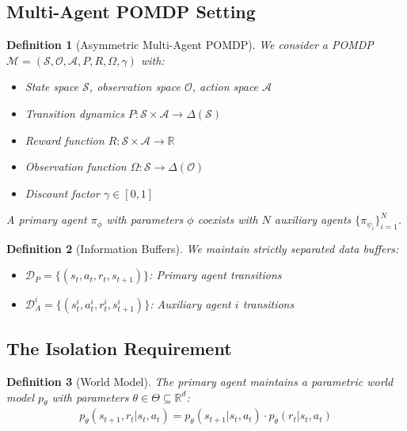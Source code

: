 \documentclass[12pt, a4paper]{article}
\newtheorem{definition}{Definition}
\begin{document}
\subsection{Multi-Agent POMDP Setting}

\begin{definition}[Asymmetric Multi-Agent POMDP]
We consider a POMDP \\$\mathcal{M} = (\mathcal{S}, \mathcal{O}, \mathcal{A}, P, R, \Omega, \gamma)$ with:
\begin{itemize}
\item State space $\mathcal{S}$, observation space $\mathcal{O}$, action space $\mathcal{A}$
\item Transition dynamics $P: \mathcal{S} \times \mathcal{A} \rightarrow \Delta(\mathcal{S})$
\item Reward function $R: \mathcal{S} \times \mathcal{A} \rightarrow \mathbb{R}$
\item Observation function $\Omega: \mathcal{S} \rightarrow \Delta(\mathcal{O})$
\item Discount factor $\gamma \in [0,1]$
\end{itemize}
A primary agent $\pi_\phi$ with parameters $\phi$ coexists with $N$ auxiliary agents $\{\pi_{\psi_i}\}_{i=1}^N$.
\end{definition}

\begin{definition}[Information Buffers]
We maintain strictly separated data buffers:
\begin{itemize}
\item $\mathcal{D}_P = \{(s_t, a_t, r_t, s_{t+1})\}$: Primary agent transitions
\item $\mathcal{D}_A^i = \{(s_t^i, a_t^i, r_t^i, s_{t+1}^i)\}$: Auxiliary agent $i$ transitions
\end{itemize}
\end{definition}

\subsection{The Isolation Requirement}

\begin{definition}[World Model]
The primary agent maintains a parametric world model $p_\theta$ with parameters $\theta \in \Theta \subseteq \mathbb{R}^d$:
\begin{align}
p_\theta(s_{t+1}, r_t | s_t, a_t) = p_\theta(s_{t+1} | s_t, a_t) \cdot p_\theta(r_t | s_t, a_t)
\end{align}
\end{definition}
\end{document}
